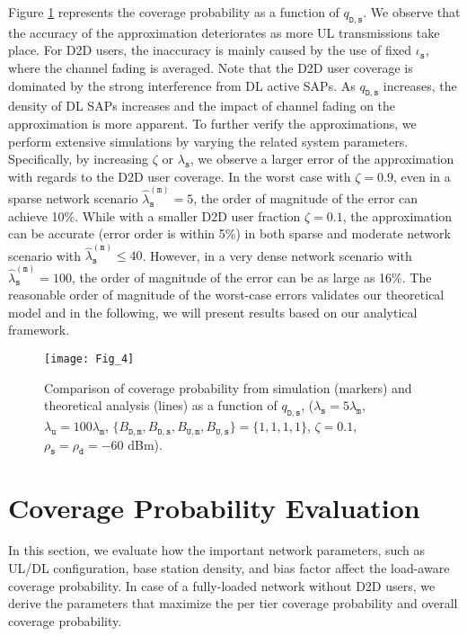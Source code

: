 \documentclass[twocolumn,english]{IEEEtran}
\theoremstyle{plain}
\theoremstyle{definition}
\begin{document}
Figure \ref{fig:Cove_q_ds} represents the coverage probability as
a function of $q_{\mathtt{D,s}}$. We observe that the accuracy of
the approximation deteriorates as more UL transmissions take place.
For D2D users, the inaccuracy is mainly caused by the use of fixed
$\iota_{\mathtt{s}}$, where the channel fading is averaged. Note
that the D2D user coverage is dominated by the strong interference
from DL active SAPs. As $q_{\mathtt{D,s}}$ increases, the density
of DL SAPs increases and the impact of channel fading on the approximation
is more apparent. To further verify the approximations, we perform
extensive simulations by varying the related system parameters. Specifically,
by increasing $\zeta$ or $\lambda_{\mathtt{s}}$, we observe a larger
error of the approximation with regards to the D2D user coverage.
In the worst case with $\zeta=0.9$, even in a sparse network scenario
$\hat{\lambda}_{\mathtt{s}}^{(\mathtt{m})}=5$, the order of magnitude
of the error can achieve 10\%. While with a smaller D2D user fraction
$\zeta=0.1$, the approximation can be accurate (error order is within
5\%) in both sparse and moderate network scenario with $\hat{\lambda}_{\mathtt{s}}^{(\mathtt{m})}\leq40$.
However, in a very dense network scenario with $\hat{\lambda}_{\mathtt{s}}^{(\mathtt{m})}=100$,
the order of magnitude of the error can be as large as 16\%. The reasonable
order of magnitude of the worst-case errors validates our theoretical
model and in the following, we will present results based on our analytical
framework.

\begin{figure}[t]
\centering\texttt{[image: Fig\_4]}

\protect\caption{\label{fig:Cove_q_ds}Comparison of coverage probability from simulation
(markers) and theoretical analysis (lines) as a function of $q_{\mathtt{D},\mathtt{s}}$,
($\lambda_{\mathtt{s}}=5\lambda_{\mathtt{m}}$, $\lambda_{\mathtt{u}}=100\lambda_{\mathtt{m}}$,
$\{B_{\mathtt{D,m}},B_{\mathtt{D,s}},B_{\mathtt{U,m}},B_{\mathtt{U,s}}\}=\{1,1,1,1\}$,
$\zeta=0.1$, $\rho_{\mathtt{s}}=\rho_{\mathtt{d}}=-60$ dBm).}
\end{figure}



\section{Coverage Probability Evaluation}

In this section, we evaluate how the important network parameters,
such as UL/DL configuration, base station density, and bias factor
affect the load-aware coverage probability. In case of a fully-loaded
network without D2D users, we derive the parameters that maximize
the per tier coverage probability and overall coverage probability.
\end{document}
